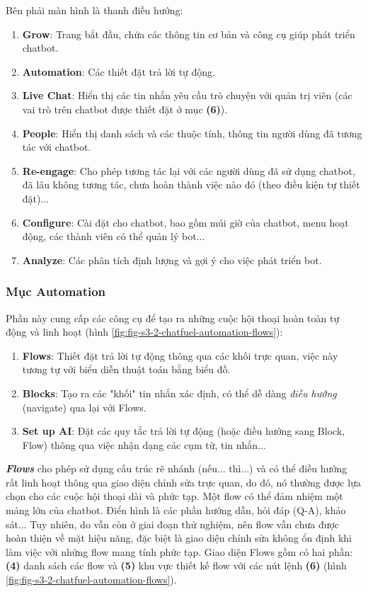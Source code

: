 Bên phải màn hình là thanh điều hướng:
\begin{enumerate}[label=\textbf{(\arabic*)},align=left,left=0cm..0cm,itemindent=*]
	\item \textbf{Grow}: Trang bắt đầu, chứa các thông tin cơ bản và công cụ giúp phát triển chatbot.
	\item \textbf{Automation}: Các thiết đặt trả lời tự động.
	\item \textbf{Live Chat}: Hiển thị các tin nhắn yêu cầu trò chuyện với quản trị viên (các vai trò trên chatbot được thiết đặt ở mục \textbf{(6)}).
	\item \textbf{People}: Hiển thị danh sách và các thuộc tính, thông tin người dùng đã tương tác với chatbot.
	\item \textbf{Re-engage}: Cho phép tương tác lại với các người dùng đã sử dụng chatbot, đã lâu không tương tác, chưa hoàn thành việc nào đó (theo điều kiện tự thiết đặt)...
	\item \textbf{Configure}: Cài đặt cho chatbot, bao gồm múi giờ của chatbot, menu hoạt động, các thành viên có thể quản lý bot...
	\item \textbf{Analyze}: Các phân tích định lượng và gợi ý cho việc phát triển bot.
\end{enumerate}

\subsubsection{Mục Automation}
Phần này cung cấp các công cụ để tạo ra những cuộc hội thoại hoàn toàn tự động và linh hoạt (hình \ref{fig:fig-s3-2-chatfuel-automation-flows}):
\begin{enumerate}[label=\textbf{(\arabic*)},align=left,left=0cm..0cm,itemindent=*]
	\item \textbf{Flows}: Thiết đặt trả lời tự động thông qua các khối trực quan, việc này tương tự với biểu diễn thuật toán bằng biểu đồ.
	\item \textbf{Blocks}: Tạo ra các "khối" tin nhắn xác định, có thể dễ dàng \textit{điều hướng} (navigate) qua lại với Flows.
	\item \textbf{Set up AI}: Đặt các quy tắc trả lời tự động (hoặc điều hướng sang Block, Flow) thông qua việc nhận dạng các cụm từ, tin nhắn...
\end{enumerate}\par
\textbf{\textit{Flows}} cho phép sử dụng cấu trúc rẽ nhánh (nếu... thì...) và có thể điều hướng rất linh hoạt thông qua giao diện chỉnh sửa trực quan, do đó, nó thường được lựa chọn cho các cuộc hội thoại dài và phức tạp. Một flow có thể đảm nhiệm một mảng lớn của chatbot. Điển hình là các phần hướng dẫn, hỏi đáp (Q-A), khảo sát... Tuy nhiên, do vẫn còn ở giai đoạn thử nghiệm, nên flow vẫn chưa được hoàn thiện về mặt hiệu năng, đặc biệt là giao diện chỉnh sửa không ổn định khi làm việc với những flow mang tính phức tạp. Giao diện Flows gồm có hai phần: \textbf{(4)} danh sách các flow và \textbf{(5)} khu vực thiết kế flow với các nút lệnh \textbf{(6)} (hình \ref{fig:fig-s3-2-chatfuel-automation-flows}).\par

